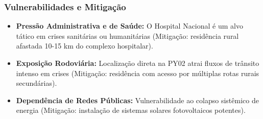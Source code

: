 \subsubsection{Vulnerabilidades e
Mitigação}

\begin{itemize}
\tightlist
\item
  \textbf{Pressão Administrativa e de Saúde:} O Hospital Nacional é um
  alvo tático em crises sanitárias ou humanitárias (Mitigação:
  residência rural afastada 10-15 km do complexo hospitalar).
\item
  \textbf{Exposição Rodoviária:} Localização direta na PY02 atrai fluxos
  de trânsito intenso em crises (Mitigação: residência com acesso por
  múltiplas rotas rurais secundárias).
\item
  \textbf{Dependência de Redes Públicas:} Vulnerabilidade ao colapso
  sistêmico de energia (Mitigação: instalação de sistemas solares
  fotovoltaicos potentes).
\end{itemize}

